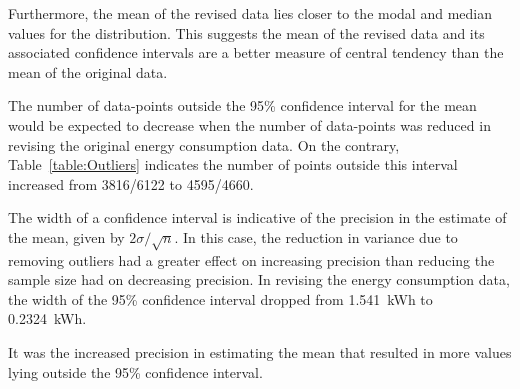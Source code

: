 \documentclass[a4paper,10pt,twocolumn]{article}
\begin{document}
Furthermore, the mean of the revised data lies closer to the modal and median 
values for the distribution. This suggests the mean of the revised data and its 
associated confidence intervals are a better measure of central tendency than 
the mean of the original data.

The number of data-points outside the 95\% confidence interval for the mean 
would be expected to decrease when the number of data-points was reduced in 
revising the original energy consumption data. On the contrary, 
Table~\vref{table:Outliers} indicates the number of points outside this 
interval increased from 3816/6122 to 4595/4660.

The width of a confidence interval is indicative of the precision in the 
estimate of the mean, given by $2\sigma/\sqrt{n}$. In this case, the reduction 
in variance due to removing outliers had a greater effect on increasing 
precision than reducing the sample size had on decreasing precision. In 
revising the energy consumption data, the width of the 95\% confidence interval 
dropped from 1.541~kWh to 0.2324~kWh.

It was the increased precision in estimating the mean that resulted in more 
values lying outside the 95\% confidence interval.

\printbibliography

\clearpage
\end{document}
